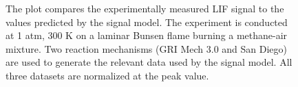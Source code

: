 \begin{figure}

\centering



\caption[Validation of LIF signal model]{The plot compares the experimentally measured LIF signal to the values predicted by the signal model. The experiment is conducted at 1 atm, 300 K on a laminar Bunsen flame burning a methane-air mixture. Two reaction mechanisms (GRI Mech 3.0 and San Diego) are used to generate the relevant data used by the signal model. All three datasets are normalized at the peak value.}

\label{fig:chPLIFSignalExperiment}

\end{figure}


